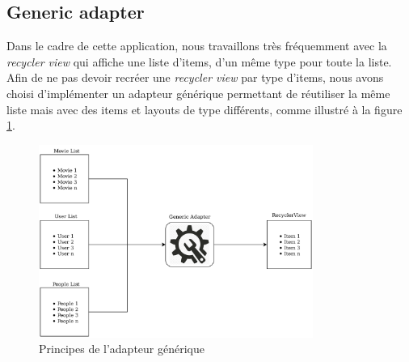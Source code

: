 \subsection{Generic adapter}\label{generic-adapter}
Dans le cadre de cette application, nous travaillons très fréquemment avec la \textit{recycler view} qui affiche une liste d'items, d'un même type pour toute la liste. Afin de ne pas devoir recréer une \textit{recycler view} par type d'items, nous avons choisi d'implémenter un adapteur générique permettant de réutiliser la même liste mais avec des items et layouts de type différents, comme illustré à la figure \ref{generic_adapter_img}.
\begin{figure}
    \begin{center}
        \includegraphics[width=0.8\textwidth]{img/schemas/Generic_Adapter.png}
    \end{center}
    \caption{Principes de l'adapteur générique}
    \label{generic_adapter_img}
\end{figure}